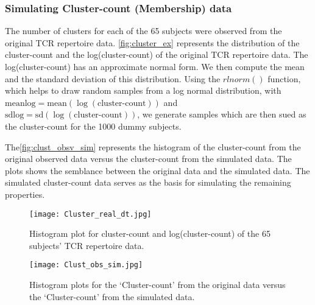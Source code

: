 \subsubsection{Simulating Cluster-count (Membership) data}\label{subsubsec:sim_clust_cnt}
The number of clusters for each of the 65 subjects were observed from the original TCR repertoire data. \autoref{fig:cluster_ex} represents the distribution of the cluster-count and the log(cluster-count) of the original TCR repertoire data. The log(cluster-count) has an approximate normal form. We then compute the mean and the standard deviation of this distribution. Using the $rlnorm()$ function, which helps to draw random samples from a log normal distribution, with $\text{meanlog} = \text{mean}(\log(\text{cluster-count}))$ and $\text{sdlog} = \text{sd}(\log(\text{cluster-count}))$, we generate samples which are then sued as the cluster-count for the 1000 dummy subjects.\par
The\autoref{fig:clust_obsv_sim} represents the histogram of the cluster-count from the original observed data versus the cluster-count from the simulated data. The plots shows the semblance between the original data and the simulated data. The simulated cluster-count data serves as the basis for simulating the remaining properties.\par
\begin{figure}[H]
\centering
\texttt{[image: Cluster\_real\_dt.jpg]}
\caption{Histogram plot for cluster-count and log(cluster-count) of the 65 subjects' TCR repertoire data.}
\label{fig:cluster_ex}
\end{figure}
\begin{figure}[H]
\centering
\texttt{[image: Clust\_obs\_sim.jpg]}
\caption{Histogram plots for the \lq Cluster-count' from the original data versus the \lq Cluster-count' from the simulated data.}
\label{fig:clust_obsv_sim}
\end{figure}
